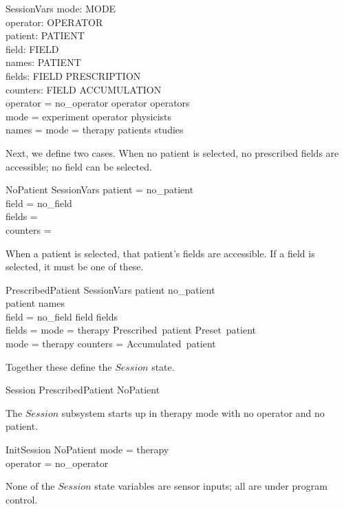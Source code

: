 \documentclass{article}
\begin{document}
\begin{schema}{SessionVars}
	mode: MODE \\
	operator: OPERATOR \\
	patient: PATIENT \\
	field: FIELD \\
	names: \power PATIENT \\
	fields: FIELD \pfun PRESCRIPTION \\
	counters: FIELD \pfun ACCUMULATION \\
\where
	operator = no\_operator \lor operator \in operators \\
	mode = experiment \implies operator \in physicists \\
	names = \IF mode = therapy \THEN patients \ELSE studies
\end{schema}
Next, we define two cases.  When no patient is selected, no
prescribed fields are accessible; no field can be selected.

\begin{schema}{NoPatient}
	SessionVars
\where
	patient = no\_patient \\
	field = no\_field \\
	fields = \emptyset \\
	counters = \emptyset \\
\end{schema}
When a patient is selected, that patient's fields are accessible.
If a field is selected, it must be one of these.

\begin{schema}{PrescribedPatient}
	SessionVars
\where
	patient \neq no\_patient \\
	patient \in names \\
	field = no\_field \lor field \in \dom fields \\
	fields = \IF mode = therapy \THEN Prescribed~patient \ELSE Preset~patient \\
	mode = therapy \implies counters = Accumulated~patient \\
\end{schema}
Together these define the $Session$ state.

\begin{zed} Session  PrescribedPatient \lor NoPatient \end{zed}
The $Session$ subsystem starts up in therapy mode with no operator and
no patient.

\begin{schema}{InitSession}
	NoPatient
\where
	mode = therapy \\
	operator = no\_operator \\
\end{schema}
None of the $Session$ state variables are sensor inputs; all are under
program control.
\end{document}
